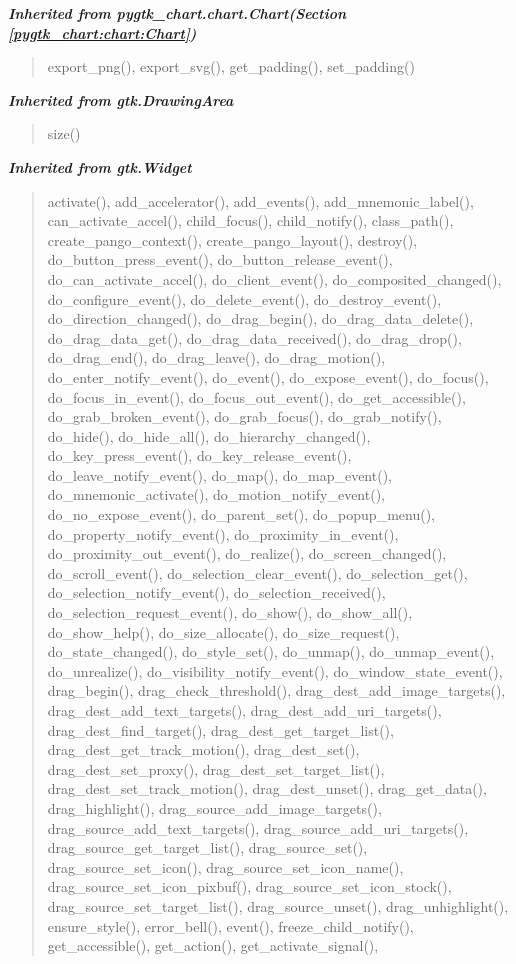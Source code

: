 \large{\textbf{\textit{Inherited from pygtk\_chart.chart.Chart\textit{(Section \ref{pygtk_chart:chart:Chart})}}}}

\begin{quote}
export\_png(), export\_svg(), get\_padding(), set\_padding()
\end{quote}

\large{\textbf{\textit{Inherited from gtk.DrawingArea}}}

\begin{quote}
size()
\end{quote}

\large{\textbf{\textit{Inherited from gtk.Widget}}}

\begin{quote}
activate(), add\_accelerator(), add\_events(), add\_mnemonic\_label(), can\_activate\_accel(), child\_focus(), child\_notify(), class\_path(), create\_pango\_context(), create\_pango\_layout(), destroy(), do\_button\_press\_event(), do\_button\_release\_event(), do\_can\_activate\_accel(), do\_client\_event(), do\_composited\_changed(), do\_configure\_event(), do\_delete\_event(), do\_destroy\_event(), do\_direction\_changed(), do\_drag\_begin(), do\_drag\_data\_delete(), do\_drag\_data\_get(), do\_drag\_data\_received(), do\_drag\_drop(), do\_drag\_end(), do\_drag\_leave(), do\_drag\_motion(), do\_enter\_notify\_event(), do\_event(), do\_expose\_event(), do\_focus(), do\_focus\_in\_event(), do\_focus\_out\_event(), do\_get\_accessible(), do\_grab\_broken\_event(), do\_grab\_focus(), do\_grab\_notify(), do\_hide(), do\_hide\_all(), do\_hierarchy\_changed(), do\_key\_press\_event(), do\_key\_release\_event(), do\_leave\_notify\_event(), do\_map(), do\_map\_event(), do\_mnemonic\_activate(), do\_motion\_notify\_event(), do\_no\_expose\_event(), do\_parent\_set(), do\_popup\_menu(), do\_property\_notify\_event(), do\_proximity\_in\_event(), do\_proximity\_out\_event(), do\_realize(), do\_screen\_changed(), do\_scroll\_event(), do\_selection\_clear\_event(), do\_selection\_get(), do\_selection\_notify\_event(), do\_selection\_received(), do\_selection\_request\_event(), do\_show(), do\_show\_all(), do\_show\_help(), do\_size\_allocate(), do\_size\_request(), do\_state\_changed(), do\_style\_set(), do\_unmap(), do\_unmap\_event(), do\_unrealize(), do\_visibility\_notify\_event(), do\_window\_state\_event(), drag\_begin(), drag\_check\_threshold(), drag\_dest\_add\_image\_targets(), drag\_dest\_add\_text\_targets(), drag\_dest\_add\_uri\_targets(), drag\_dest\_find\_target(), drag\_dest\_get\_target\_list(), drag\_dest\_get\_track\_motion(), drag\_dest\_set(), drag\_dest\_set\_proxy(), drag\_dest\_set\_target\_list(), drag\_dest\_set\_track\_motion(), drag\_dest\_unset(), drag\_get\_data(), drag\_highlight(), drag\_source\_add\_image\_targets(), drag\_source\_add\_text\_targets(), drag\_source\_add\_uri\_targets(), drag\_source\_get\_target\_list(), drag\_source\_set(), drag\_source\_set\_icon(), drag\_source\_set\_icon\_name(), drag\_source\_set\_icon\_pixbuf(), drag\_source\_set\_icon\_stock(), drag\_source\_set\_target\_list(), drag\_source\_unset(), drag\_unhighlight(), ensure\_style(), error\_bell(), event(), freeze\_child\_notify(), get\_accessible(), get\_action(), get\_activate\_signal(), 
\end{quote}
